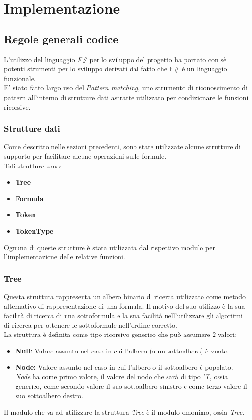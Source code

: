 \documentclass[\main/tesi.tex]{subfiles}
\begin{document}
\chapter{Implementazione}

\section{Regole generali codice}
L'utilizzo del linguaggio \textit{F\#} \cite{fsharp} per lo sviluppo del progetto ha portato con sè potenti strumenti per lo sviluppo derivati dal fatto che F\# \cite{fsharp} è un linguaggio funzionale. \\
E' stato fatto largo uso del \textit{Pattern matching}, uno strumento di riconoscimento di pattern all'interno di strutture dati astratte utilizzato per condizionare le funzioni ricorsive. \\

\subsection{Strutture dati}
Come descritto nelle sezioni precedenti, sono state utilizzate alcune strutture di supporto per facilitare alcune operazioni sulle formule. \\
Tali strutture sono:
\begin{itemize}
    \item \textbf{Tree}
    \item \textbf{Formula}
    \item \textbf{Token}
    \item \textbf{TokenType}
\end{itemize}
Ognuna di queste strutture è stata utilizzata dal rispettivo modulo per l'implementazione delle relative funzioni.

\subsection{Tree}
Questa struttura rappresenta un albero binario di ricerca utilizzato come metodo alternativo di rappresentazione di una formula. Il motivo del suo utilizzo è la sua facilità di ricerca di una sottoformula e la sua facilità nell'utilizzare gli algoritmi di ricerca per ottenere le sottoformule nell'ordine corretto. \\
La struttura è definita come tipo ricorsivo generico che può assumere 2 valori:
\begin{itemize}
    \item \textbf{Null:} Valore assunto nel caso in cui l'albero (o un sottoalbero) è vuoto.
    \item \textbf{Node:} Valore assunto nel caso in cui l'albero o il sottoalbero è popolato. \textit{Node} ha come primo valore, il valore del nodo che sarà di tipo \textit{'T}, ossia generico, come secondo valore il suo sottoalbero sinistro e come terzo valore il suo sottoalbero destro.
\end{itemize}
Il modulo che va ad utilizzare la struttura \textit{Tree} è il modulo omonimo, ossia \textit{Tree}.
\end{document}
